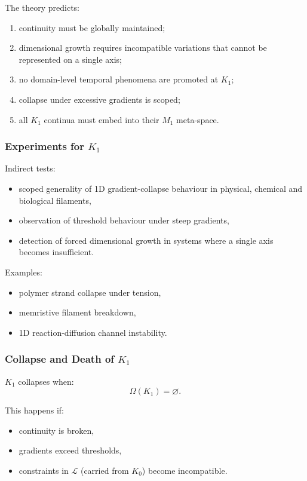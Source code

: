 The theory predicts:
\begin{enumerate}
    \item continuity must be globally maintained;
    \item dimensional growth requires incompatible variations that cannot
          be represented on a single axis;
    \item no domain-level temporal phenomena are promoted at $K_1$;
    \item collapse under excessive gradients is scoped;
    \item all $K_1$ continua must embed into their $M_1$ meta-space.
\end{enumerate}

\subsubsection{Experiments for \texorpdfstring{$K_1$}{K_1}}

Indirect tests:
\begin{itemize}
    \item scoped generality of 1D gradient-collapse behaviour in physical,
          chemical and biological filaments,
    \item observation of threshold behaviour under steep gradients,
    \item detection of forced dimensional growth in systems where a
          single axis becomes insufficient.
\end{itemize}

Examples:
\begin{itemize}
    \item polymer strand collapse under tension,
    \item memristive filament breakdown,
    \item 1D reaction-diffusion channel instability.
\end{itemize}

\subsubsection{Collapse and Death of \texorpdfstring{$K_1$}{K_1}}

$K_1$ collapses when:
\[
\Omega(K_1) = \varnothing.
\]

This happens if:
\begin{itemize}
    \item continuity is broken,
    \item gradients exceed thresholds,
    \item constraints in $\mathcal{L}$ (carried from $K_0$) become
          incompatible.
\end{itemize}

